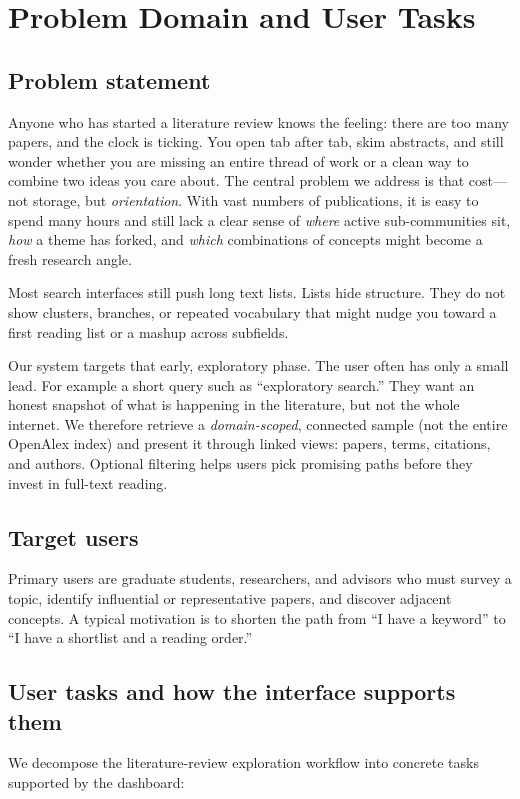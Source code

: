 \documentclass[sigconf]{acmart}
\begin{document}
\section{Problem Domain and User Tasks}

\subsection{Problem statement}
Anyone who has started a literature review knows the feeling: there are too many papers, and the clock is ticking. You open tab after tab, skim abstracts, and still wonder whether you are missing an entire thread of work or a clean way to combine two ideas you care about. The central problem we address is that cost---not storage, but \emph{orientation}. With vast numbers of publications, it is easy to spend many hours and still lack a clear sense of \emph{where} active sub-communities sit, \emph{how} a theme has forked, and \emph{which} combinations of concepts might become a fresh research angle.

Most search interfaces still push long text lists. Lists hide structure. They do not show clusters, branches, or repeated vocabulary that might nudge you toward a first reading list or a mashup across subfields.

Our system targets that early, exploratory phase. The user often has only a small lead. For example a short query such as ``exploratory search.'' They want an honest snapshot of what is happening in the literature, but not the whole internet. We therefore retrieve a \emph{domain-scoped}, connected sample (not the entire OpenAlex index) and present it through linked views: papers, terms, citations, and authors. Optional filtering helps users pick promising paths before they invest in full-text reading.

\subsection{Target users}
Primary users are graduate students, researchers, and advisors who must survey a topic, identify influential or representative papers, and discover adjacent concepts. A typical motivation is to shorten the path from ``I have a keyword'' to ``I have a shortlist and a reading order.''

\subsection{User tasks and how the interface supports them}
We decompose the literature-review exploration workflow into concrete tasks supported by the dashboard:
\end{document}
